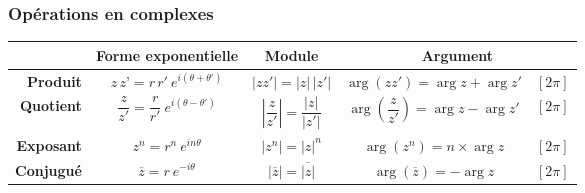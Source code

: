 \documentclass[11pt,a4paper,fleqn,pdftex]{report}
\begin{document}
\subsubsection{Opérations en complexes} %
\label{ssub:operations_complexes}
\begin{tabular}{>{\bfseries}r c | c | c l}
    & \textbf{Forme exponentielle} & \textbf{Module} & \multicolumn{2}{c}{\textbf{Argument}} \\
    \hline
  Produit
      & $z\, z’ = r\, r'\: e^{i\left( \theta + \theta ' \right)}$ %
      & $\left| zz' \right| = |z|\, |z'|$ %
      & $ \arg (zz') = \arg z + \arg z'  $ & $ [2\pi ] $ \\

  Quotient
      & $\dfrac{z}{z'} = \dfrac{r}{r'}\: e^{i\left( \theta - \theta ' \right)}$ %
      & $\left| \dfrac{z}{z'} \right| = \dfrac{|z|}{|z'|}$ %
      & $ \arg \left( \dfrac{z}{z'} \right) = \arg z - \arg z'  $ & $[2\pi ] $ \\
  Exposant
      & $z^n = r^n \: e^{in\theta}$ %
      & $\left| z^n \right| = |z|^n$ %
      & $ \arg \left( z^n \right) = n \times \arg z$ & $ [2\pi ] $ \\
  Conjugué
      & $\overline{z} = r\: e^{-i\theta}$ %
      & $\left| \overline{z} \right| = \overline{|z|}$ %
      & $ \arg (\overline{z}) = -\arg z$ & $ [2\pi ] $ \\
  \hline
\end{tabular}
\end{document}
